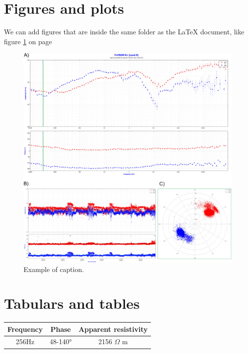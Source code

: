 \documentclass[10pt,a4paper]{article}
\begin{document}
\section{Figures and plots}
We can add figures that are inside the same folder as the LaTeX document, like figure \ref{plot1} on page \pageref{plot1}
\begin{figure}
	\begin{center}
		\includegraphics[width = 14cm]{phd-isterre-poster-2023-fig.jpg}
	\end{center}
	\caption{Example of caption.}
	\label{plot1} %
\end{figure}



\section{Tabulars and tables}
\vspace{1cm}
\begin{tabular}{|c|c|c|}
\hline %
\textbf{Frequency} & \textbf{Phase} & \textbf{Apparent resistivity} \\ %
\hline
256Hz & 48-140° & 2156 $\Omega$ m \\
\hline
\end{tabular}
\end{document}
